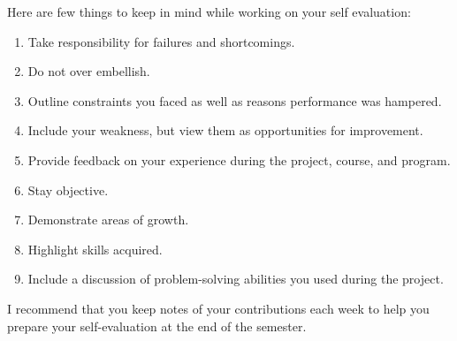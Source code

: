 \documentclass[11pt, oneside]{article}   	%
\begin{document}
Here are few things to keep in mind while working on your self evaluation:
\begin{enumerate}
\item Take responsibility for failures and shortcomings.
\item Do not over embellish.
\item Outline constraints you faced as well as reasons performance was hampered.
\item Include your weakness, but view them as opportunities for improvement.
\item Provide feedback on your experience during the project, course, and program.
\item Stay objective.
\item Demonstrate areas of growth.
\item Highlight skills acquired.
\item Include a discussion of problem-solving abilities you used during the project.
\end{enumerate}

I recommend that you keep notes of your contributions each week to help you
prepare your self-evaluation at the end of the semester.



\end{document}
